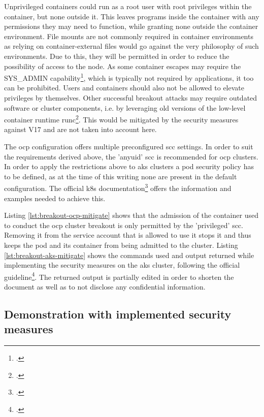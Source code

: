 \newpage
Unprivileged containers could run as a root user with root privileges within the container, but none outside it. This leaves programs inside the container with any permissions they may need to function, while granting none outside the container environment. File mounts are not commonly required in container environments as relying on container-external files would go against the very philosophy of such environments. Due to this, they will be permitted in order to reduce the possibility of access to the node. As some container escapes may require the SYS{\_}ADMIN capability\footcite[][, section 'Requirements to use this technique']{trailOfBitsEscape}, which is typically not required by applications, it too can be prohibited. Users and containers should also not be allowed to elevate privileges by themselves. Other successful breakout attacks may require outdated software or cluster components, i.e. by leveraging old versions of the low-level container runtime runc\footcite[][, section 'What Is The Vulnerability?']{runcVuln}. This would be mitigated by the security measures against V17 and are not taken into account here.

The \gls{ocp} configuration offers multiple preconfigured \gls{scc} settings. In order to suit the requirements derived above, the 'anyuid' \gls{scc} is recommended for \gls{ocp} clusters.
In order to apply the restrictions above to \gls{aks} clusters a pod security policy has to be defined, as at the time of this writing none are present in the default configuration. The official \gls{k8s} documentation\footcite[][, section 'Example Policies']{securityPolicy} offers the information and examples needed to achieve this.


Listing \ref{lst:breakout-ocp-mitigate} shows that the admission of the container used to conduct the \gls{ocp} cluster breakout is only permitted by the 'privileged' \gls{scc}. Removing it from the service account that is allowed to use it stops it and thus keeps the pod and its container from being admitted to the cluster.
Listing \ref{lst:breakout-aks-mitigate} shows the commands used and output returned while implementing the security measures on the \gls{aks} cluster, following the official guideline\footcite[][, section 'Enable pod security policy on an AKS cluster']{aksPodSecPol}. The returned output is partially edited in order to shorten the document as well as to not disclose any confidential information.

\subsection{Demonstration with implemented security measures}

